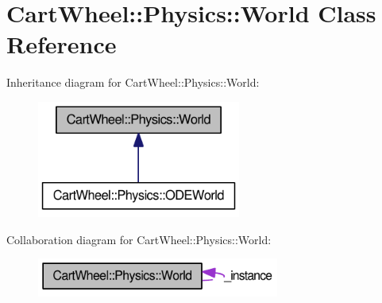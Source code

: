 \hypertarget{classCartWheel_1_1Physics_1_1World}{
\section{CartWheel::Physics::World Class Reference}
\label{classCartWheel_1_1Physics_1_1World}
}


Inheritance diagram for CartWheel::Physics::World:\nopagebreak
\begin{figure}[H]
\begin{center}
\leavevmode
\includegraphics[width=190pt]{classCartWheel_1_1Physics_1_1World__inherit__graph}
\end{center}
\end{figure}


Collaboration diagram for CartWheel::Physics::World:\nopagebreak
\begin{figure}[H]
\begin{center}
\leavevmode
\includegraphics[width=226pt]{classCartWheel_1_1Physics_1_1World__coll__graph}
\end{center}
\end{figure}
